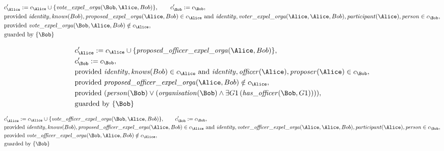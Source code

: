 \begin{align*}
&
c'_
{
\Alice
}
 := 
c_
{
\Alice
}
 \cup 
\{
\mathit{\detokenize{
vote_expel_orga
}}
(
\Bob
,
\Alice
,
Bob
)
\}
, \qquad 
c'_
{
\Bob
}
 := 
c_
{
\Bob
}
,\\
&
\text{provided } 
\mathit{\detokenize{
identity
}}
,
\mathit{\detokenize{
knows
}}
(
Bob
)
,
\mathit{\detokenize{
proposed_expel_orga
}}
(
\Alice
,
Bob
)
 \in c_
{
\Alice
}
 \text{ and } 
\mathit{\detokenize{
identity
}}
,
\mathit{\detokenize{
voter_expel_orga
}}
(
\Alice
,
\Alice
,
Bob
)
,
\mathit{\detokenize{
participant
}}
(
\Alice
)
,
\mathit{\detokenize{
person
}}
 \in c_
{
\Bob
}
,\\
&
\text{provided } 
\mathit{\detokenize{
vote_expel_orga
}}
(
\Bob
,
\Alice
,
Bob
)
 \notin c_
{
\Alice
}
,\\
&
\text{guarded by } \{
\Bob
\}
\end{align*}

\begin{align*}
&
c'_
{
\Alice
}
 := 
c_
{
\Alice
}
 \cup 
\{
\mathit{\detokenize{
proposed_officer_expel_orga
}}
(
\Alice
,
Bob
)
\}
,\\
&
c'_
{
\Bob
}
 := 
c_
{
\Bob
}
,\\
&
\text{provided } 
\mathit{\detokenize{
identity
}}
,
\mathit{\detokenize{
knows
}}
(
Bob
)
 \in c_
{
\Alice
}
 \text{ and } 
\mathit{\detokenize{
identity
}}
,
\mathit{\detokenize{
officer
}}
(
\Alice
)
,
\mathit{\detokenize{
proposer
}}
(
\Alice
)
 \in c_
{
\Bob
}
,\\
&
\text{provided } 
\mathit{\detokenize{
proposed_officer_expel_orga
}}
(
\Alice
,
Bob
)
 \notin c_
{
\Alice
}
,\\
&
\text{provided } 
(
\mathit{\detokenize{
person
}}
(
\Bob
)
\lor
(
\mathit{\detokenize{
organisation
}}
(
\Bob
)
\land
\exists 
G1
\,(
\mathit{\detokenize{
has_officer
}}
(
\Bob
,
G1
)
)
)
)
,\\
&
\text{guarded by } \{
\Bob
\}
\end{align*}

\begin{align*}
&
c'_
{
\Alice
}
 := 
c_
{
\Alice
}
 \cup 
\{
\mathit{\detokenize{
vote_officer_expel_orga
}}
(
\Bob
,
\Alice
,
Bob
)
\}
, \qquad 
c'_
{
\Bob
}
 := 
c_
{
\Bob
}
,\\
&
\text{provided } 
\mathit{\detokenize{
identity
}}
,
\mathit{\detokenize{
knows
}}
(
Bob
)
,
\mathit{\detokenize{
proposed_officer_expel_orga
}}
(
\Alice
,
Bob
)
 \in c_
{
\Alice
}
 \text{ and } 
\mathit{\detokenize{
identity
}}
,
\mathit{\detokenize{
voter_officer_expel_orga
}}
(
\Alice
,
\Alice
,
Bob
)
,
\mathit{\detokenize{
participant
}}
(
\Alice
)
,
\mathit{\detokenize{
person
}}
 \in c_
{
\Bob
}
,\\
&
\text{provided } 
\mathit{\detokenize{
vote_officer_expel_orga
}}
(
\Bob
,
\Alice
,
Bob
)
 \notin c_
{
\Alice
}
,\\
&
\text{guarded by } \{
\Bob
\}
\end{align*}

